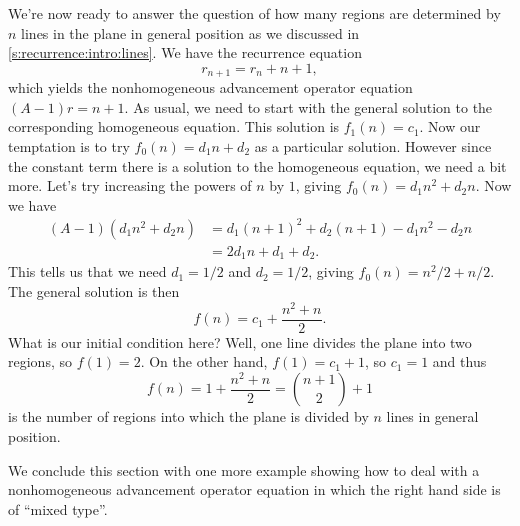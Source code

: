 \begin{example}\label{ex:recurrence:lines-solved}
  We're now ready to answer the question of how many regions are
  determined by $n$ lines in the plane in general position as we
  discussed in \autoref{s:recurrence:intro:lines}. We have the
  recurrence equation
  \[r_{n+1} = r_n + n+1,\]
  which yields the nonhomogeneous advancement operator equation
  $(A-1)r = n+1$. As usual, we need to start with the general
  solution to the corresponding homogeneous equation. This solution is
  $f_1(n) = c_1$. Now our temptation is to try $f_0(n)=d_1n+d_2$ as a
  particular solution. However since the constant term there is a
  solution to the homogeneous equation, we need a bit more. Let's try
  increasing the powers of $n$ by $1$, giving $f_0(n) = d_1n^2 +
  d_2n$. Now we have
  \begin{align*}
    (A-1)(d_1n^2+d_2n) & = d_1(n+1)^2+d_2(n+1) - d_1n^2 -d_2n\\
    & = 2d_1n+d_1+d_2.
  \end{align*}
  This tells us that we need $d_1=1/2$ and $d_2=1/2$, giving $f_0(n) =
  n^2/2 + n/2$. The general solution is then
  \[f(n) = c_1 + \frac{n^2+n}{2}.\]
  What is our initial condition here? Well, one line divides the plane
  into two regions, so $f(1) = 2$. On the other hand, $f(1) = c_1 +
  1$, so $c_1=1$ and thus
  \[f(n) = 1 + \frac{n^2+n}{2} = \binom{n+1}{2} + 1\]
  is the number of regions into which the plane is divided by $n$
  lines in general position.
\end{example}

We conclude this section with one more example showing how to deal
with a nonhomogeneous advancement operator equation in which the right
hand side is of ``mixed type''.


